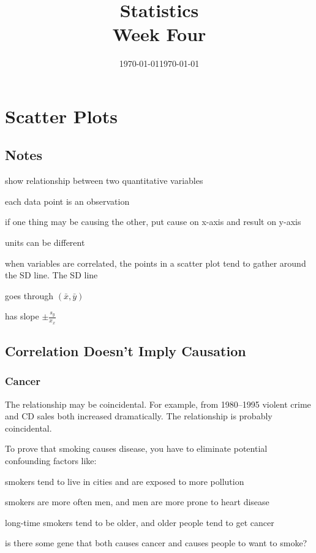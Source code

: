 \documentclass[landscape]{exam}
\author{}
\date{\today}
\title{Statistics \\ Week Four}
\date{\today}
\author{}
\begin{document}
\maketitle
\tableofcontents

  \section{Scatter Plots}

  \subsection{Notes}
  \begin{itemize*}
    \item show relationship between two quantitative variables
    \item each data point is an observation
    \item if one thing may be causing the other, put cause on x-axis and
      result on y-axis
    \item units can be different
    \item when variables are correlated, the points in a scatter plot tend to
      gather around the SD line.  The SD line 
      \begin{itemize*}
        \item goes through $(\bar{x}, \bar{y})$
        \item has slope $\pm \frac{s_y}{x_x}$
      \end{itemize*}
  \end{itemize*}

  \subsection{Correlation Doesn't Imply Causation}  

  \subsubsection{Cancer} %
  
  The relationship may be coincidental.  For example, from 1980--1995 violent
  crime and CD sales both increased dramatically.  The relationship is
  probably coincidental.  

  To prove that smoking causes disease, you have to eliminate potential
  confounding factors like:
  \begin{itemize*}
    \item smokers tend to live in cities and are exposed to more pollution
    \item smokers are more often men, and men are more prone to heart disease
    \item long-time smokers tend to be older, and older people tend to get
      cancer
    \item is there some gene that both causes cancer and causes people to
      want to smoke?
  \end{itemize*}
\end{document}

